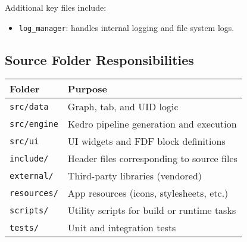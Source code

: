 Additional key files include:
\begin{itemize}
    \item \texttt{log\_manager}: handles internal logging and file system logs.
\end{itemize}

\subsection*{Source Folder Responsibilities}

\begin{longtable}{|l|p{10cm}|}
\hline
\textbf{Folder} & \textbf{Purpose} \\
\hline
\texttt{src/data} & Graph, tab, and UID logic \\
\texttt{src/engine} & Kedro pipeline generation and execution \\
\texttt{src/ui} & UI widgets and FDF block definitions \\
\texttt{include/} & Header files corresponding to source files \\
\texttt{external/} & Third-party libraries (vendored) \\
\texttt{resources/} & App resources (icons, stylesheets, etc.) \\
\texttt{scripts/} & Utility scripts for build or runtime tasks \\
\texttt{tests/} & Unit and integration tests \\
\hline
\end{longtable}